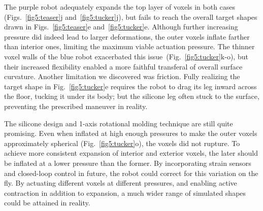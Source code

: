 

The purple robot adequately expands the top layer of voxels in both cases (Figs.~\ref{fig5:teaser}j and~\ref{fig5:tucker}j), but fails to reach the overall target shapes drawn in Figs.~\ref{fig5:teaser}e and~\ref{fig5:tucker}e. 
Although further increasing pressure did indeed lead to larger deformations,
the outer voxels inflate farther than interior ones, limiting the maximum viable actuation pressure. 
The thinner voxel walls of the blue robot exacerbated this issue~\mbox{(Fig.~\ref{fig5:tucker}k-o)}, 
but their increased flexibility enabled a more faithful transferal of overall surface curvature.
Another limitation we discovered was friction.
Fully realizing the target shape in Fig.~\ref{fig5:tucker}e requires the robot to drag its leg inward across the floor, tucking it under its body; but the silicone leg often stuck to the surface, preventing the prescribed maneuver in reality.


The silicone design and 1-axis rotational molding technique are still quite promising. 
Even when inflated at high enough pressures to make the outer voxels approximately spherical (Fig.~\ref{fig5:tucker}o), the voxels did not rupture. 
To achieve more consistent expansion of interior and exterior voxels, the later should be inflated at a lower pressure than the former.
By incorporating strain sensors \cite{white_low-cost_2017} and closed-loop control in future, the robot could correct for this variation on the fly.
By actuating different voxels at different pressures, and enabling active contraction in addition to expansion, a much wider range of simulated shapes could be attained in reality. 

